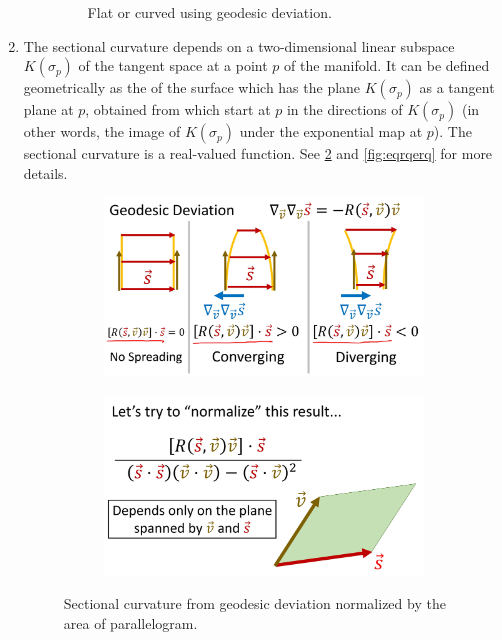 \documentclass[12pt]{article} %
\begin{document}
\begin{enumerate}[label=\textbf{\arabic*})]
\begin{enumerate}[label=(\textbf{\alph*})]
\begin{figure}[H]
    \caption{\small Flat or curved using geodesic deviation.}
    \label{fig:trwred}
\end{figure}
    \end{enumerate}
    \item {} The sectional curvature depends on a two-dimensional linear subspace $K(\sigma_p)$ of the tangent space at a point $p$ of the manifold. It can be defined geometrically as the  of the surface which has the plane $K(\sigma_p)$ as a tangent plane at $p$, obtained from  which start at $p$ in the directions of $K(\sigma_p)$ (in other words, the image of $K(\sigma_p)$ under the exponential map at $p$). The sectional curvature is a real-valued function.  See \cref{fig:dagrteqr} and \cref{fig:eqrqerq} for more details.
        \begin{figure}[H]
     \centering
     \begin{subfigure}[b]{0.45\textwidth}
         \centering
         \includegraphics[width=\textwidth]{Figs/s1.jpg}
     \end{subfigure}
     \hfill
     \begin{subfigure}[b]{0.45\textwidth}
         \centering
         \includegraphics[width=\textwidth]{Figs/s2.jpg}
     \end{subfigure}
     \caption{\small Sectional curvature from geodesic deviation normalized by the area of parallelogram.} \label{fig:dagrteqr}
\end{figure}
    

\end{enumerate}
\end{document}
